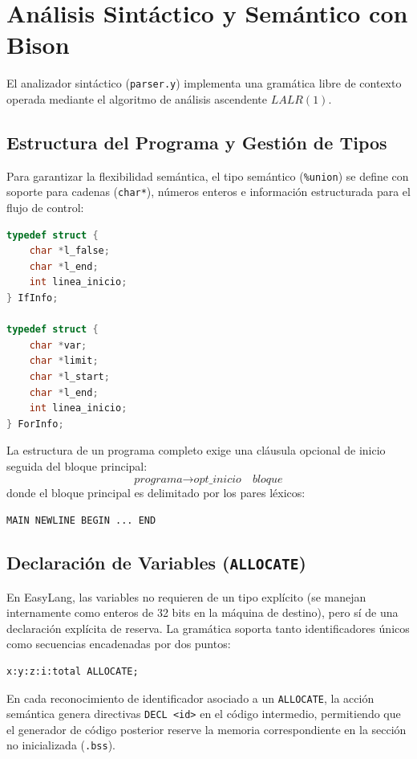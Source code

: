 \documentclass[conference]{IEEEtran}
\begin{document}
\section{Análisis Sintáctico y Semántico con Bison}
El analizador sintáctico (\texttt{parser.y}) implementa una gramática libre de contexto operada mediante el algoritmo de análisis ascendente $LALR(1)$.

\subsection{Estructura del Programa y Gestión de Tipos}
Para garantizar la flexibilidad semántica, el tipo semántico (\texttt{\%union}) se define con soporte para cadenas (\texttt{char*}), números enteros e información estructurada para el flujo de control:
\begin{lstlisting}[language=C]
typedef struct {
    char *l_false;
    char *l_end;
    int linea_inicio;
} IfInfo;

typedef struct {
    char *var;
    char *limit;
    char *l_start;
    char *l_end;
    int linea_inicio;
} ForInfo;
\end{lstlisting}

La estructura de un programa completo exige una cláusula opcional de inicio seguida del bloque principal:
\begin{equation}
\textit{programa} \rightarrow \textit{opt\_inicio} \quad \textit{bloque}
\end{equation}
donde el bloque principal es delimitado por los pares léxicos:
\begin{center}
\texttt{MAIN NEWLINE BEGIN ... END}
\end{center}

\subsection{Declaración de Variables (\texttt{ALLOCATE})}
En EasyLang, las variables no requieren de un tipo explícito (se manejan internamente como enteros de 32 bits en la máquina de destino), pero sí de una declaración explícita de reserva. La gramática soporta tanto identificadores únicos como secuencias encadenadas por dos puntos:
\begin{lstlisting}
x:y:z:i:total ALLOCATE;
\end{lstlisting}
En cada reconocimiento de identificador asociado a un \texttt{ALLOCATE}, la acción semántica genera directivas \texttt{DECL <id>} en el código intermedio, permitiendo que el generador de código posterior reserve la memoria correspondiente en la sección no inicializada (\texttt{.bss}).
\end{document}
